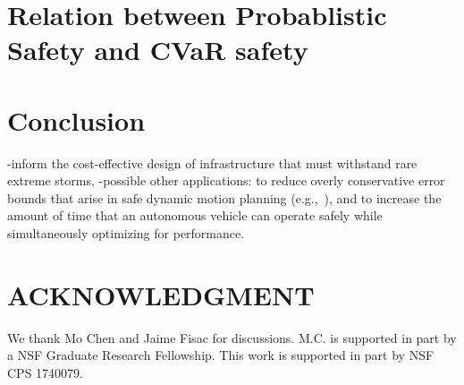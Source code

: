 \documentclass[letterpaper, 10 pt, conference]{ieeeconf}  %
\begin{document}
\section{Relation between Probablistic Safety and CVaR safety}\label{lemmaconnection}







\section{Conclusion}\label{conclusion}
-inform the cost-effective design of infrastructure that must withstand rare extreme storms,
-possible other applications: to reduce overly conservative error bounds that arise in safe dynamic motion planning (e.g.,~\cite{herbert2017fastrack}), 
and to increase the amount of time that an autonomous vehicle can operate safely while simultaneously optimizing for performance.


\section*{ACKNOWLEDGMENT}
We thank Mo Chen and Jaime Fisac for discussions.
M.C. is supported in part by a NSF Graduate Research Fellowship.
This work is supported in part by NSF CPS 1740079.


\addtolength{\textheight}{-2cm}   %


\end{document}
